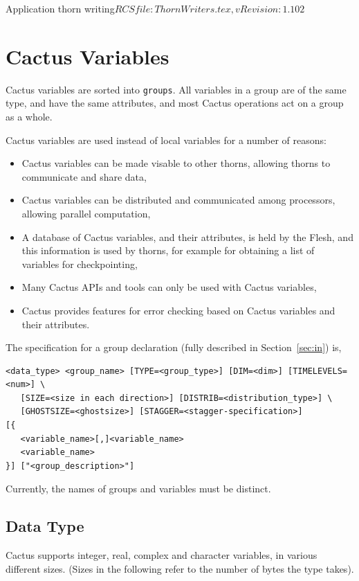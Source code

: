 \begin{cactuspart}{2}{Application thorn writing}{$RCSfile: ThornWriters.tex,v $}{$Revision: 1.102 $}

\chapter{Cactus Variables}
\label{sec:cava}

Cactus variables are sorted into {\tt groups}.  All variables in a group
are of the same type, and have
the same attributes, and most Cactus operations act on a group as a whole.

Cactus variables are used instead of local variables for a number of reasons:
\begin{itemize}
\item Cactus variables can be made visable to other thorns, allowing
thorns to communicate and share data,
\item Cactus  variables can be distributed and communicated
        among processors, allowing parallel computation,
\item A database of Cactus variables, and their attributes, is held by
      the Flesh, and this information is used by thorns, for example for
      obtaining a list of variables for checkpointing,
\item Many Cactus APIs and tools can only be used with Cactus variables,
\item Cactus provides features for error checking based on Cactus variables
      and their attributes.
\end{itemize}

The specification for a group declaration
(fully described in Section~\ref{sec:in}) is,

\begin{verbatim}
<data_type> <group_name> [TYPE=<group_type>] [DIM=<dim>] [TIMELEVELS=<num>] \
   [SIZE=<size in each direction>] [DISTRIB=<distribution_type>] \
   [GHOSTSIZE=<ghostsize>] [STAGGER=<stagger-specification>]
[{
   <variable_name>[,]<variable_name>
   <variable_name>
}] ["<group_description>"]
\end{verbatim}

Currently, the names of groups and variables must be distinct.

\section{Data Type}

Cactus supports integer, real, complex and character variables, in
various different sizes.  (Sizes in the following refer to the number of
bytes the type takes).


\end{cactuspart}
